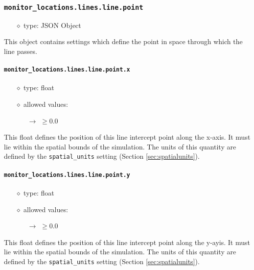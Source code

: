 \documentclass[]{article}
\def\code#1{\texttt{#1}}
\begin{document}
\subsubsection{\code{monitor\_locations.lines.line.point}}
\begin{itemize}
    \item[$\diamond$] type: JSON Object 
\end{itemize}
This object contains settings which define the point in space through which the
line passes.

\paragraph{\code{monitor\_locations.lines.line.point.x}}
\begin{itemize}
    \item[$\diamond$] type: float 
    \item[$\diamond$] allowed values:
    \begin{itemize}
        \item[$\rightarrow$] $\geq0.0$
    \end{itemize}
\end{itemize}
This float defines the position of this line intercept point along the x-axis. It
must lie within the spatial bounds of the simulation. The units of this quantity
are defined by the \code{spatial\_units} setting (Section
\ref{sec:spatialunits}).

\paragraph{\code{monitor\_locations.lines.line.point.y}}
\begin{itemize}
    \item[$\diamond$] type: float 
    \item[$\diamond$] allowed values:
    \begin{itemize}
        \item[$\rightarrow$] $\geq0.0$
    \end{itemize}
\end{itemize}
This float defines the position of this line intercept point along the y-ayis. It
must lie within the spatial bounds of the simulation. The units of this quantity
are defined by the \code{spatial\_units} setting (Section
\ref{sec:spatialunits}).
\end{document}
